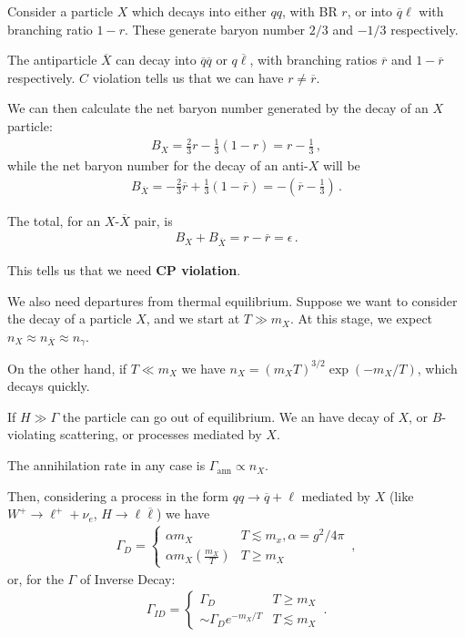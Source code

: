 \documentclass[main.tex]{subfiles}
\begin{document}
Consider a particle \(X\) which decays into either \(qq\), with BR \(r\), or into \(\overline{q} \ell\) with branching ratio \(1 - r\). 
These generate baryon number \(2/3\) and \(-1/3\) respectively.

The antiparticle \(\overline{X}\) can decay into \(\overline{q} \overline{q}\) or \(q \overline{\ell}\), with branching ratios \(\overline{r}\) and \(1 - \overline{r}\) respectively. 
\(C\) violation tells us that we can have \(r \neq \overline{r}\).

We can then calculate the net baryon number generated by the decay of an \(X\) particle: 
%
\begin{align}
B_X = \frac{2}{3} r - \frac{1}{3} (1 - r) = r - \frac{1}{3}
\,,
\end{align}
%
while the net baryon number for the decay of an anti-\(X\) will be 
%
\begin{align}
B_{\overline{X}} = -  \frac{2}{3} \overline{r} + \frac{1}{3} (1 - \overline{r}) = - (\overline{r} - \frac{1}{3})
\,.
\end{align}

The total, for an \(X\)-\(\overline{X}\) pair, is
%
\begin{align}
B_X + B_{\overline{X}} = r - \overline{r} = \epsilon 
\,.
\end{align}

This tells us that we need \textbf{CP violation}.

We also need departures from thermal equilibrium. 
Suppose we want to consider the decay of a particle \(X\), and we start at \(T \gg m_X\). 
At this stage, we expect \(n_X \approx n_{\overline{X}} \approx n_\gamma\). 

On the other hand, if \(T \ll m_X\) we have  \(n_X = (m_X T)^{3/2} \exp(- m_X / T)\), which decays quickly. 


If \(H \gg \Gamma \) the particle can go out of equilibrium. 
We an have decay of \(X\), or \(B\)-violating scattering, or processes mediated by \(X\). 

The annihilation rate in any case is \(\Gamma _{\text{ann}} \propto n_X\). 

Then, considering a process in the form \(qq \to \overline{q} + \ell\) mediated by \(X\) (like \(W^{+} \to \ell^{+} + \nu _e\), \(H \to \ell \overline{\ell}\))
we have 
%
\begin{align}
\Gamma _D = 
\begin{cases}
    \alpha  m_X & T \lesssim m_x, \alpha = g^2 / 4 \pi \\
    \alpha  m_X ( \frac{m_X}{T}) & T \geq m_X
\end{cases}
\,,
\end{align}
%
or, for the \(\Gamma \) of Inverse Decay:
%
\begin{align}
\Gamma_{ID} = \begin{cases}
    \Gamma _D & T \geq m_X \\
    \sim \Gamma _D e^{- m_X / T} & T \lesssim m_X
\end{cases}
\,.
\end{align}
\end{document}

